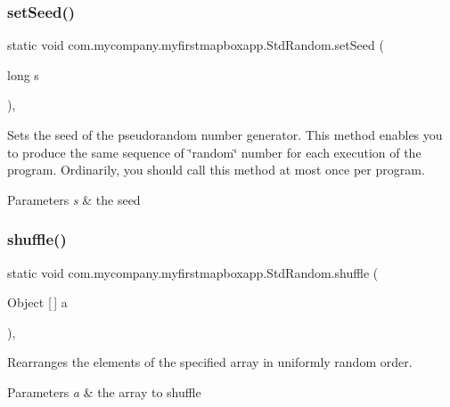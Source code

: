 \subsubsection{\texorpdfstring{set\+Seed()}{setSeed()}}
{\footnotesize\ttfamily static void com.\+mycompany.\+myfirstmapboxapp.\+Std\+Random.\+set\+Seed (\begin{DoxyParamCaption}\item[{long}]{s }\end{DoxyParamCaption})\hspace{0.3cm}{\ttfamily [inline]}, {\ttfamily [static]}}

Sets the seed of the pseudorandom number generator. This method enables you to produce the same sequence of \char`\"{}random\char`\"{} number for each execution of the program. Ordinarily, you should call this method at most once per program.


\begin{DoxyParams}{Parameters}
{\em s} & the seed \\
\hline
\end{DoxyParams}
\mbox{\label{classcom_1_1mycompany_1_1myfirstmapboxapp_1_1_std_random_a5b6775422fed87e7f618d61bfd693218}} 
\subsubsection{\texorpdfstring{shuffle()}{shuffle()}\hspace{0.1cm}{\footnotesize\ttfamily [1/7]}}
{\footnotesize\ttfamily static void com.\+mycompany.\+myfirstmapboxapp.\+Std\+Random.\+shuffle (\begin{DoxyParamCaption}\item[{Object \mbox{[}$\,$\mbox{]}}]{a }\end{DoxyParamCaption})\hspace{0.3cm}{\ttfamily [inline]}, {\ttfamily [static]}}

Rearranges the elements of the specified array in uniformly random order.


\begin{DoxyParams}{Parameters}
{\em a} & the array to shuffle \\
\hline
\end{DoxyParams}

